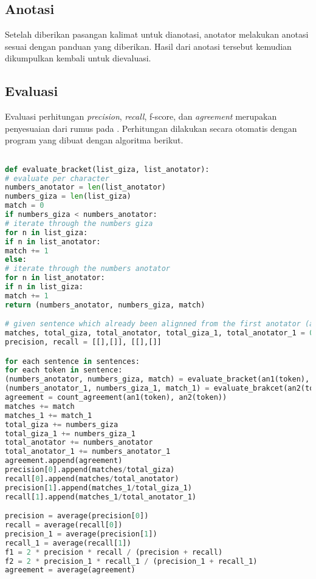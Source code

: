 \subsection{Anotasi}
Setelah diberikan pasangan kalimat untuk dianotasi, anotator melakukan anotasi sesuai dengan panduan yang diberikan. Hasil dari anotasi tersebut kemudian dikumpulkan kembali untuk dievaluasi.

\subsection{Evaluasi}
Evaluasi perhitungan \textit{precision}, \textit{recall}, f-score, dan \textit{agreement} merupakan penyesuaian dari rumus pada \citep{mihalcea2003evaluation}. Perhitungan dilakukan secara otomatis dengan program yang dibuat dengan algoritma berikut.

\begin{lstlisting}[language=Python, caption={Word Alignment Evaluation}, label={word-alignment-evaluation}]

def evaluate_bracket(list_giza, list_anotator):
# evaluate per character
numbers_anotator = len(list_anotator)
numbers_giza = len(list_giza)
match = 0
if numbers_giza < numbers_anotator:
# iterate through the numbers giza
for n in list_giza:
if n in list_anotator:
match += 1
else:
# iterate through the numbers anotator
for n in list_anotator:
if n in list_giza:
match += 1
return (numbers_anotator, numbers_giza, match)

# given sentence which already been alignned from the first anotator (an1), second anotator(an2), and giza(giza)
matches, total_giza, total_anotator, total_giza_1, total_anotator_1 = 0, 0, 0, 0, 0
precision, recall = [[],[]], [[],[]]

for each sentence in sentences:
for each token in sentence:
(numbers_anotator, numbers_giza, match) = evaluate_bracket(an1(token), giza(token))
(numbers_anotator_1, numbers_giza_1, match_1) = evaluate_brakcet(an2(token), giza(token))
agreement = count_agreement(an1(token), an2(token))
matches += match
matches_1 += match_1
total_giza += numbers_giza
total_giza_1 += numbers_giza_1
total_anotator += numbers_anotator
total_anotator_1 += numbers_anotator_1
agreement.append(agreement)
precision[0].append(matches/total_giza)
recall[0].append(matches/total_anotator)
precision[1].append(matches_1/total_giza_1)
recall[1].append(matches_1/total_anotator_1)

precision = average(precision[0])
recall = average(recall[0])
precision_1 = average(precision[1])
recall_1 = average(recall[1])
f1 = 2 * precision * recall / (precision + recall)
f2 = 2 * precision_1 * recall_1 / (precision_1 + recall_1)
agreement = average(agreement)	

\end{lstlisting}

